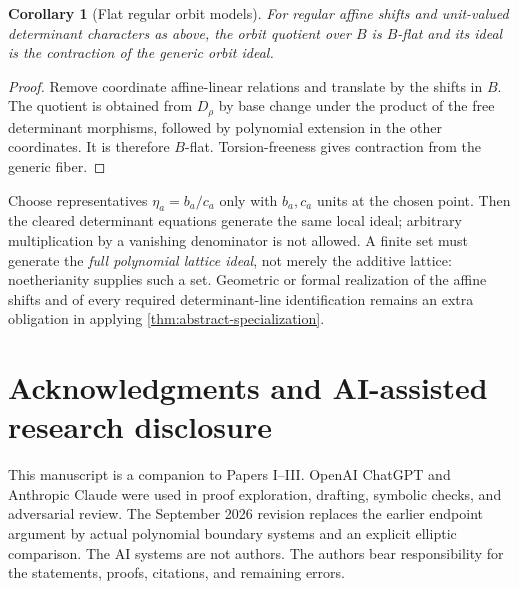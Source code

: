 \documentclass[11pt]{article}
\numberwithin{equation}{section}
\newtheorem{corollary}[corollary]{Corollary}
\theoremstyle{definition}
\theoremstyle{remark}
\begin{document}
\begin{corollary}[Flat regular orbit models]\label{cor:flat-orbit}
For regular affine shifts and unit-valued determinant characters as above,
the orbit quotient over $B$ is $B$-flat and its ideal is the contraction of
the generic orbit ideal.
\end{corollary}
\begin{proof}
Remove coordinate affine-linear relations and translate by the shifts in
$B$. The quotient is obtained from $D_\rho$ by base change under the
product of the free determinant morphisms, followed by polynomial
extension in the other coordinates. It is therefore $B$-flat.
Torsion-freeness gives contraction from the generic fiber.
\end{proof}

Choose representatives $\eta_a=b_a/c_a$ only with $b_a,c_a$ units at the
chosen point. Then the cleared determinant equations generate the same
local ideal; arbitrary multiplication by a vanishing denominator is not
allowed. A finite set must generate the \emph{full polynomial lattice
ideal}, not merely the additive lattice: noetherianity supplies such a
set. Geometric or formal realization of the affine shifts and of every
required determinant-line identification remains an extra obligation in
applying \cref{thm:abstract-specialization}.

\section*{Acknowledgments and AI-assisted research disclosure}
This manuscript is a companion to Papers I--III. OpenAI ChatGPT and
Anthropic Claude were used in proof exploration, drafting, symbolic checks,
and adversarial review. The September 2026 revision replaces the earlier
endpoint argument by actual polynomial boundary systems and an explicit
elliptic comparison. The AI systems are not authors. The authors bear
responsibility for the statements, proofs, citations, and remaining errors.
\end{document}
